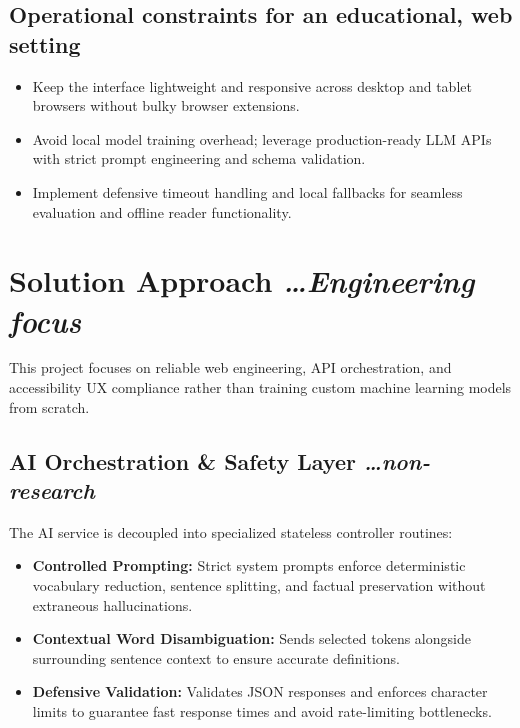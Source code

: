 \documentclass[11pt,a4paper]{article}
\newcommand{\BvrHint}[1]{%
  {\normalfont\normalsize\itshape\hfill #1}}
\begin{document}
\subsection{Operational constraints for an educational, web setting}
\begin{itemize}[leftmargin=0.7cm]
    \item Keep the interface lightweight and responsive across desktop and tablet browsers without bulky browser extensions.
    \item Avoid local model training overhead; leverage production-ready LLM APIs with strict prompt engineering and schema validation.
    \item Implement defensive timeout handling and local fallbacks for seamless evaluation and offline reader functionality.
\end{itemize}

\section{Solution Approach %
\BvrHint{\ldots Engineering focus}}
This project focuses on reliable web engineering, API orchestration, and accessibility UX compliance rather than training custom machine learning models from scratch.

\subsection{AI Orchestration \& Safety Layer %
\BvrHint{\ldots non-research}}
The AI service is decoupled into specialized stateless controller routines:
\begin{itemize}[leftmargin=0.7cm]
    \item \textbf{Controlled Prompting:} Strict system prompts enforce deterministic vocabulary reduction, sentence splitting, and factual preservation without extraneous hallucinations.
    \item \textbf{Contextual Word Disambiguation:} Sends selected tokens alongside surrounding sentence context to ensure accurate definitions.
    \item \textbf{Defensive Validation:} Validates JSON responses and enforces character limits to guarantee fast response times and avoid rate-limiting bottlenecks.
\end{itemize}
\end{document}
